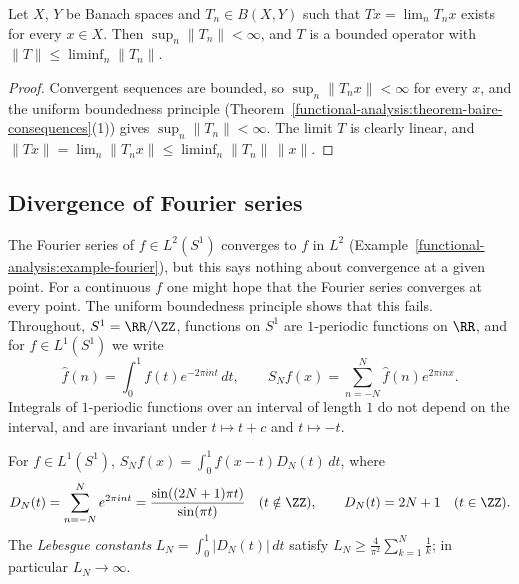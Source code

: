 \begin{corollary}\label{functional-analysis:corollary-banach-steinhaus}
Let $X$, $Y$ be Banach spaces and $T_n \in B(X, Y)$ such that $Tx = \lim_nT_nx$ exists for every $x \in X$. Then $\sup_n\|T_n\| < \infty$, and $T$ is a bounded operator with
$\|T\| \leq \liminf_n\|T_n\|$.
\end{corollary}

\begin{proof}
Convergent sequences are bounded, so $\sup_n\|T_nx\| < \infty$ for every $x$, and the uniform boundedness principle (Theorem~\ref{functional-analysis:theorem-baire-consequences}(1)) gives
$\sup_n\|T_n\| < \infty$. The limit $T$ is clearly linear, and $\|Tx\| = \lim_n\|T_nx\| \leq \liminf_n\|T_n\|\,\|x\|$.
\end{proof}

\subsection{Divergence of Fourier series}\label{functional-analysis:subsection-fourier-divergence}

The Fourier series of $f \in L^2(S^1)$ converges to $f$ in $L^2$ (Example~\ref{functional-analysis:example-fourier}), but this says nothing about convergence at a given point. For a continuous $f$ one
might hope that the Fourier series converges at every point. The uniform boundedness principle shows that this fails. Throughout, $S^1 = \RR/\ZZ$, functions on $S^1$ are $1$-periodic functions on $\RR$, and
for $f \in L^1(S^1)$ we write
\[
\hat f(n) = \int_0^1f(t)e^{-2\pi int}\,dt, \qquad S_Nf(x) = \sum_{n=-N}^N\hat f(n)e^{2\pi inx}.
\]
Integrals of $1$-periodic functions over an interval of length $1$ do not depend on the interval, and are invariant under $t \mapsto t + c$ and $t \mapsto -t$.

\begin{lemma}\label{functional-analysis:lemma-dirichlet-kernel}
For $f \in L^1(S^1)$, $S_Nf(x) = \int_0^1f(x - t)D_N(t)\,dt$, where
\[
D_N(t) = \sum_{n=-N}^Ne^{2\pi int} = \frac{\sin((2N + 1)\pi t)}{\sin(\pi t)} \quad (t \notin \ZZ), \qquad D_N(t) = 2N + 1 \quad (t \in \ZZ).
\]
The \emph{Lebesgue constants} $L_N = \int_0^1|D_N(t)|\,dt$ satisfy $L_N \geq \frac{4}{\pi^2}\sum_{k=1}^N\frac1k$; in particular $L_N \to \infty$.
\end{lemma}

